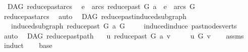 \begin{isabellebody}
%
\isadelimproof
\isanewline
%
\endisadelimproof
\isanewline
{}\isamarkupfalse%
\ {\isacharparenleft}{\kern0pt}\ DAG{\isacharparenright}{\kern0pt}\ reduce{\isacharunderscore}{\kern0pt}past{\isacharunderscore}{\kern0pt}arcs{}{\isacharcolon}{\kern0pt}\isanewline
\ \ {\isachardoublequoteopen}e\ {\isasymin}\ arcs\ {\isacharparenleft}{\kern0pt}reduce{\isacharunderscore}{\kern0pt}past\ G\ a{\isacharparenright}{\kern0pt}\ {\isasymLongrightarrow}\ e\ {\isasymin}\ arcs\ G{\isachardoublequoteclose}\isanewline
%
\isadelimproof
\ \ %
\endisadelimproof
%
\isatagproof
{}\isamarkupfalse%
\ reduce{\isacharunderscore}{\kern0pt}past{\isacharunderscore}{\kern0pt}arcs\ \isamarkupfalse%
\ auto%
\endisatagproof
{\isafoldproof}%
%
\isadelimproof
\isanewline
%
\endisadelimproof
\isanewline
{}\isamarkupfalse%
\ {\isacharparenleft}{\kern0pt}\ DAG{\isacharparenright}{\kern0pt}\ reduce{\isacharunderscore}{\kern0pt}past{\isacharunderscore}{\kern0pt}induced{\isacharunderscore}{\kern0pt}subgraph{\isacharcolon}{\kern0pt}\isanewline
\ \ \ {\isachardoublequoteopen}induced{\isacharunderscore}{\kern0pt}subgraph\ {\isacharparenleft}{\kern0pt}reduce{\isacharunderscore}{\kern0pt}past\ G\ a{\isacharparenright}{\kern0pt}\ G{\isachardoublequoteclose}\isanewline
%
\isadelimproof
\ \ %
\endisadelimproof
%
\isatagproof
{}\isamarkupfalse%
\ \ induced{\isacharunderscore}{\kern0pt}induce\ past{\isacharunderscore}{\kern0pt}nodes{\isacharunderscore}{\kern0pt}verts\ \isamarkupfalse%
\ auto%
\endisatagproof
{\isafoldproof}%
%
\isadelimproof
\isanewline
%
\endisadelimproof
\isanewline
{}\isamarkupfalse%
\ {\isacharparenleft}{\kern0pt}\ DAG{\isacharparenright}{\kern0pt}\ reduce{\isacharunderscore}{\kern0pt}past{\isacharunderscore}{\kern0pt}path{\isacharcolon}{\kern0pt}\isanewline
\ \ \ {\isachardoublequoteopen}u\ {\isasymrightarrow}\isactrlsup {\isacharplus}{\kern0pt}\isactrlbsub reduce{\isacharunderscore}{\kern0pt}past\ G\ a\isactrlesub \ v{\isachardoublequoteclose}\ \isanewline
\ \ \ {\isachardoublequoteopen}\ u\ {\isasymrightarrow}\isactrlsup {\isacharplus}{\kern0pt}\isactrlbsub G\isactrlesub \ v{\isachardoublequoteclose}\isanewline
%
\isadelimproof
\ \ %
\endisadelimproof
%
\isatagproof
{}\isamarkupfalse%
\ assms\isanewline
{}\isamarkupfalse%
\ induct\isanewline
\ \ \isamarkupfalse%
\ base\ \isamarkupfalse%
\ \isamarkupfalse%

\end{isabellebody}
